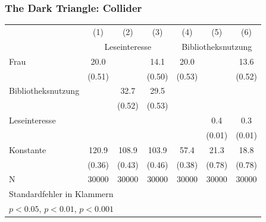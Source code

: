 \documentclass[18pt, aspectratio=169]{beamer}
\begin{document}
\begin{frame}
\frametitle{The Dark Triangle: Collider}

\begin{tabular}{l*{6}{c}}
\toprule
                    &\multicolumn{1}{c}{(1)}&\multicolumn{1}{c}{(2)}&\multicolumn{1}{c}{(3)}&\multicolumn{1}{c}{(4)}&\multicolumn{1}{c}{(5)}&\multicolumn{1}{c}{(6)}\\
                    &\multicolumn{3}{c}{Leseinteresse}&\multicolumn{3}{c}{Bibliotheksnutzung}\\
\midrule
Frau                &        20.0\sym{***}&                     &        14.1\sym{***}&        20.0\sym{***}&                     &        13.6\sym{***}\\
                    &      (0.51)         &                     &      (0.50)         &      (0.53)         &                     &      (0.52)         \\
Bibliotheksnutzung  &                     &        32.7\sym{***}&        29.5\sym{***}&                     &                     &                     \\
                    &                     &      (0.52)         &      (0.53)         &                     &                     &                     \\
Leseinteresse       &                     &                     &                     &                     &         0.4\sym{***}&         0.3\sym{***}\\
                    &                     &                     &                     &                     &      (0.01)         &      (0.01)         \\
Konstante           &       120.9\sym{***}&       108.9\sym{***}&       103.9\sym{***}&        57.4\sym{***}&        21.3\sym{***}&        18.8\sym{***}\\
                    &      (0.36)         &      (0.43)         &      (0.46)         &      (0.38)         &      (0.78)         &      (0.78)         \\
\midrule
N        &       30000         &       30000         &       30000         &       30000         &       30000         &       30000         \\
\bottomrule
\multicolumn{6}{l}{\footnotesize Standardfehler in Klammern}\\
\multicolumn{6}{l}{\footnotesize \sym{*} \(p<0.05\), \sym{**} \(p<0.01\), \sym{***} \(p<0.001\)}\\
\end{tabular}

\end{frame}
\end{document}
